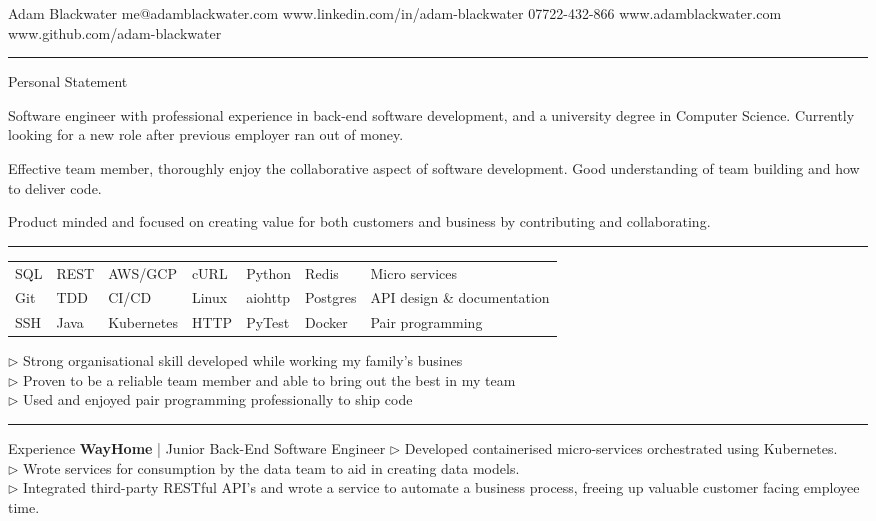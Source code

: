 \documentclass[12pt,twoside]{article}
\begin{document}
\topheading
    {Adam Blackwater}
    {me@adamblackwater.com }
    {www.linkedin.com/in/adam-blackwater}
    {07722-432-866}
    {www.adamblackwater.com}
    {www.github.com/adam-blackwater}

\vspace{0.6em}
\hrule
\vspace{0.6em}

\statement
    {Personal Statement}
    {
        Software engineer with professional experience in back-end software
        development, and a university degree in Computer Science. Currently
        looking for a new role after previous employer ran out of money.

        \hspace{1.5em}Effective team member, thoroughly enjoy the
        collaborative aspect of software development. Good understanding of
        team building and how to deliver code. 

        \hspace{1.5em}Product minded and focused on creating value for both
        customers and business by contributing and collaborating.
    }

\vspace{0.8em}
\hrule
\vspace{0.8em}

\begin{center}
    \begin{tabular}{l l l l l l l}
        SQL & REST & AWS/GCP & cURL & Python & Redis & Micro services \\
        Git & TDD & CI/CD & Linux & aiohttp & Postgres & API design \& documentation \\
        SSH & Java & Kubernetes & HTTP & PyTest& Docker & Pair programming
    \end{tabular}
\end{center}
    
\parbox{35em}{
        $\triangleright$ Strong organisational skill developed while working my family's busines \\
        $\triangleright$ Proven to be a reliable team member and able to bring out the best in my team \\
        $\triangleright$ Used and enjoyed pair programming professionally to ship code 
    }

\vspace{0.8em}
\hrule
\vspace{0.8em}

\headedsection
    {Experience}
    {
        \textbf{WayHome} | Junior Back-End Software Engineer}
    {
        $\triangleright$ Developed containerised micro-services orchestrated using Kubernetes. \\
        $\triangleright$ Wrote services for consumption by the data team to aid
        in creating data models. \\
        $\triangleright$ Integrated third-party RESTful API's and wrote a service to
        automate a business process, freeing up valuable customer facing
        employee time.
    }
\end{document}
